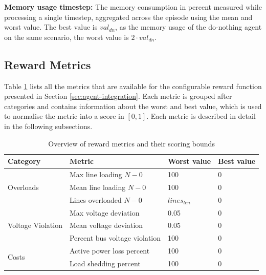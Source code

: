 \textbf{Memory usage timestep:} The memory consumption in percent measured while processing a single timestep, aggregated across the episode using the mean and worst value. The best value is $val_{dn}$, as the memory usage of the do-nothing agent on the same scenario, the worst value is $2 \cdot val_{dn}$.




\subsection{Reward Metrics}\label{ssec:reward-metrics-description}
Table \ref{tab:reward_metrics} lists all the metrics that are available for the configurable reward function presented in Section \ref{sec:agent-integration}. Each metric is grouped after categories and contains information about the worst and best value, which  is used to normalise the metric into a score in $[0,1]$. Each metric is described in detail in the following subsections.

\begin{table}[htbp]
\centering
\small
\caption{Overview of reward metrics and their scoring bounds}
\label{tab:reward_metrics}
\begin{tabular}{ | p{} | p{} | p{} | p{} |}
\hline
\textbf{Category} & \textbf{Metric} & \textbf{Worst value} & \textbf{Best value} \\
\hline

\multirow{3}{=}{Overloads}
& Max line loading $N-0$ & 100 & 0 \\
& Mean line loading $N-0$ & 100 & 0 \\
& Lines overloaded $N-0$ & $lines_{len}$ & 0 \\
\hline

\multirow{3}{=}{Voltage Violation}
& Max voltage deviation & 0.05 & 0 \\
& Mean voltage deviation & 0.05 & 0 \\
& Percent bus voltage violation & 100 & 0 \\
\hline

\multirow{2}{=}{Costs}
& Active power loss percent & 100 & 0 \\
& Load shedding percent & 100 & 0 \\
\hline

\end{tabular}
\end{table}

\FloatBarrier

